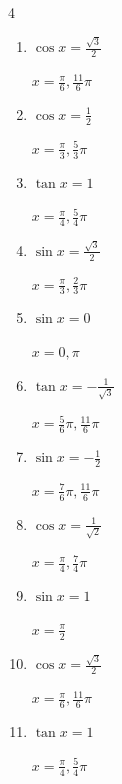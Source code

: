 \begin{multicols}{4}
\begin{enumerate}
        $\displaystyle x = \frac{\pi}{2} , \frac{3}{2}\pi$

  \item $\displaystyle \cos{x}  = \frac{\sqrt{3}}{2}$

        $\displaystyle x = \frac{\pi}{6} , \frac{11}{6}\pi$

  \item $\displaystyle \cos{x}  = \frac{1}{2}$

        $\displaystyle x = \frac{\pi}{3} , \frac{5}{3}\pi$

  \item $\displaystyle \tan{x}  = 1$

        $\displaystyle x = \frac{\pi}{4} , \frac{5}{4}\pi$

  \item $\displaystyle \sin{x}  = \frac{\sqrt{3}}{2}$

        $\displaystyle x = \frac{\pi}{3} , \frac{2}{3}\pi$

  \item $\displaystyle \sin{x}  = 0$

        $\displaystyle x = 0 , \pi$

\columnbreak %

  \item $\displaystyle \tan{x}  = -\frac{1}{\sqrt{3}}$

        $\displaystyle x = \frac{5}{6}\pi , \frac{11}{6}\pi$

  \item $\displaystyle \sin{x}  = -\frac{1}{2}$

        $\displaystyle x = \frac{7}{6}\pi , \frac{11}{6}\pi$

  \item $\displaystyle \cos{x}  = \frac{1}{\sqrt{2}}$

        $\displaystyle x = \frac{\pi}{4} , \frac{7}{4}\pi$

  \item $\displaystyle \sin{x}  = 1$

        $\displaystyle x = \frac{\pi}{2}$

  \item $\displaystyle \cos{x}  = \frac{\sqrt{3}}{2}$

        $\displaystyle x = \frac{\pi}{6} , \frac{11}{6}\pi$

  \item $\displaystyle \tan{x}  = 1$

        $\displaystyle x = \frac{\pi}{4} , \frac{5}{4}\pi$


\end{enumerate}
\end{multicols}
